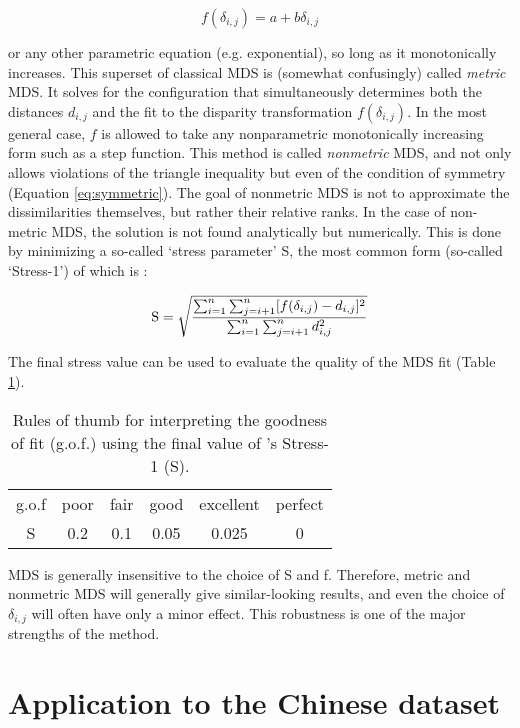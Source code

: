 \documentclass[authoryear,preprint,review,12pt]{elsarticle}
\begin{document}
\begin{equation}
f(\delta_{i,j}) = a + b \delta_{i,j}
\label{eq:f}
\end{equation}

or any other parametric equation (e.g. exponential), so long as it
monotonically increases. This superset of classical MDS is (somewhat
confusingly) called \emph{metric} MDS. It solves for the configuration
that simultaneously determines both the distances $d_{i,j}$ and the
fit to the disparity transformation $f(\delta_{i,j})$.  In the most
general case, $f$ is allowed to take any nonparametric monotonically
increasing form such as a step function. This method is called
\emph{nonmetric} MDS, and not only allows violations of the triangle
inequality but even of the condition of symmetry (Equation
\ref{eq:symmetric}). The goal of nonmetric MDS is not to approximate
the dissimilarities themselves, but rather their relative ranks.  In
the case of non-metric MDS, the solution is not found analytically but
numerically. This is done by minimizing a so-called `stress parameter'
S, the most common form (so-called `Stress-1') of which is
\citep{kruskal1964}:

\begin{equation}
\mbox{S} = \sqrt{\frac{\sum_{i=1}^{n}\sum_{j=i+1}^{n}
[f(\delta_{i,j})-d_{i,j}]^2}
{\sum_{i=1}^{n}\sum_{j=i+1}^{n}d_{i,j}^2}}\\
\label{eq:stress}
\end{equation}

The final stress value can be used to evaluate the quality of the MDS
fit (Table \ref{tab:gof}).

\begin{table}[ht]
\centering
\begin{tabular}{c|ccccc}
g.o.f & poor & fair & good & excellent & perfect\\
S & 0.2 & 0.1 & 0.05 & 0.025 & 0
\end{tabular}
\caption{Rules of thumb for interpreting the goodness of fit (g.o.f.)
  using the final value of \citet{kruskal1964}'s Stress-1 (S).}
\label{tab:gof}
\end{table}

MDS is generally insensitive to the choice of S and f. Therefore,
metric and nonmetric MDS will generally give similar-looking results,
and even the choice of $\delta_{i,j}$ will often have only a minor
effect.  This robustness is one of the major strengths of the method.

\section{Application to the Chinese dataset}
\label{sec:application}
\end{document}
